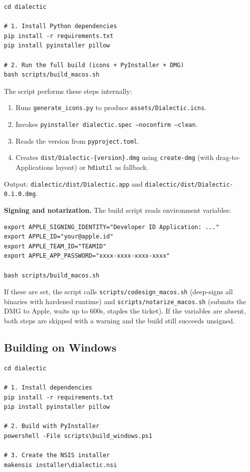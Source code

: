 \documentclass[11pt,letterpaper]{article}
\newcommand{\file}[1]{\texttt{#1}}
\newcommand{\cmd}[1]{\texttt{#1}}
\begin{document}
\begin{lstlisting}
cd dialectic

# 1. Install Python dependencies
pip install -r requirements.txt
pip install pyinstaller pillow

# 2. Run the full build (icons + PyInstaller + DMG)
bash scripts/build_macos.sh
\end{lstlisting}

The script performs these steps internally:
\begin{enumerate}[leftmargin=1.5em,itemsep=0.1em]
  \item Runs \file{generate\_icons.py} to produce \file{assets/Dialectic.icns}.
  \item Invokes \cmd{pyinstaller dialectic.spec --noconfirm --clean}.
  \item Reads the version from \file{pyproject.toml}.
  \item Creates \file{dist/Dialectic-\{version\}.dmg} using \cmd{create-dmg} (with drag-to-Applications layout) or \cmd{hdiutil} as fallback.
\end{enumerate}

Output: \file{dialectic/dist/Dialectic.app} and \file{dialectic/dist/Dialectic-0.1.0.dmg}.

\textbf{Signing and notarization.} The build script reads environment variables:
\begin{lstlisting}
export APPLE_SIGNING_IDENTITY="Developer ID Application: ..."
export APPLE_ID="your@apple.id"
export APPLE_TEAM_ID="TEAMID"
export APPLE_APP_PASSWORD="xxxx-xxxx-xxxx-xxxx"

bash scripts/build_macos.sh
\end{lstlisting}

If these are set, the script calls \file{scripts/codesign\_macos.sh} (deep-signs all binaries with hardened runtime) and \file{scripts/notarize\_macos.sh} (submits the DMG to Apple, waits up to 600s, staples the ticket). If the variables are absent, both steps are skipped with a warning and the build still succeeds unsigned.

\subsection{Building on Windows}

\begin{lstlisting}
cd dialectic

# 1. Install dependencies
pip install -r requirements.txt
pip install pyinstaller pillow

# 2. Build with PyInstaller
powershell -File scripts\build_windows.ps1

# 3. Create the NSIS installer
makensis installer\dialectic.nsi
\end{lstlisting}
\end{document}
